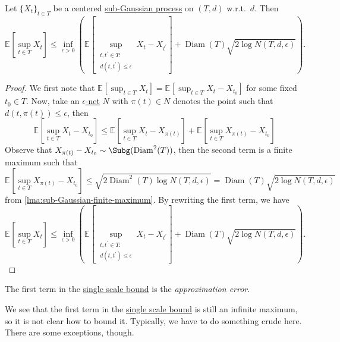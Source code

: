 \begin{lemma}\label{lma:single-scale-bound}
	Let \(\{ X_t \} _{t\in T}\) be a centered \hyperref[def:sub-Gaussian-process]{sub-Gaussian process} on \((T, d)\) w.r.t.\ \(d\). Then
	\[
		\mathbb{E}_{}\left[\sup _{t\in T} X_t \right]
		\leq \inf _{\epsilon > 0} \left( \mathbb{E}_{}\left[\sup _{\substack{t, t^{\prime} \in T\colon \\ d(t, t^{\prime} ) \leq \epsilon }} X_t - X_{t^{\prime} } \right] + \mathop{\mathrm{Diam}}(T) \sqrt{2 \log N(T, d, \epsilon )} \right) .
	\]
\end{lemma}
\begin{proof}
	We first note that \(\mathbb{E}_{}\left[\sup _{t\in T} X_t \right] = \mathbb{E}_{}\left[\sup _{t\in T} X_t - X_{t_0} \right]  \) for some fixed \(t_0\in T\). Now, take an \hyperref[def:eps-net]{\(\epsilon\)-net} \(N\) with \(\pi (t) \in N\) denotes the point such that \(d(t, \pi (t)) \leq \epsilon \), then
	\[
		\mathbb{E}_{}\left[\sup _{t\in T} X_t - X_{t_0} \right]
		\leq \mathbb{E}_{}\left[\sup _{t\in T} X_t - X_{\pi (t)} \right] + \mathbb{E}_{}\left[\sup _{t\in T} X_{\pi (t)} - X_{t_0} \right]
	\]
	Observe that \(X_{\pi (t)} - X_{t_0} \sim \Subg(\mathop{\mathrm{Diam}}^2(T) )\), then the second term is a finite maximum such that
	\[
		\mathbb{E}_{}\left[\sup _{t\in T} X_{\pi (t)} - X_{t_0} \right]
		\leq \sqrt{2 \mathop{\mathrm{Diam}}\nolimits^2(T) \log N(T, d, \epsilon )}
		= \mathop{\mathrm{Diam}}(T) \sqrt{2 \log N(T, d, \epsilon )}
	\]
	from \autoref{lma:sub-Gaussian-finite-maximum}. By rewriting the first term, we have
	\[
		\mathbb{E}_{}\left[\sup _{t\in T} X_t \right]
		\leq \inf _{\epsilon > 0} \left( \mathbb{E}_{}\left[\sup _{\substack{t, t^{\prime} \in T\colon \\ d(t, t^{\prime} ) \leq \epsilon }} X_t - X_{t^{\prime} } \right] + \mathop{\mathrm{Diam}}(T) \sqrt{2 \log N(T, d, \epsilon )} \right) .
	\]
\end{proof}

\begin{notation}
	The first term in the \hyperref[lma:single-scale-bound]{single scale bound} is the \emph{approximation error}.
\end{notation}

We see that the first term in the \hyperref[lma:single-scale-bound]{single scale bound} is still an infinite maximum, so it is not clear how to bound it. Typically, we have to do something crude here. There are some exceptions, though.

